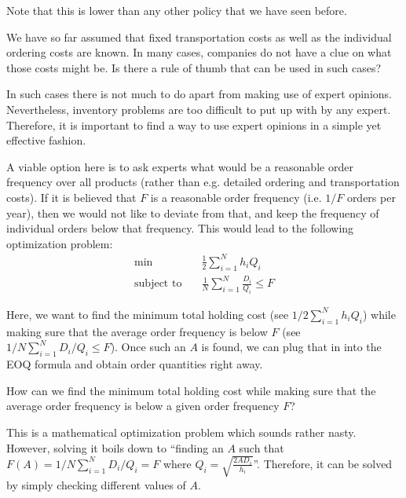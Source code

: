 Note that this is lower than any other policy that we have seen before. 


\begin{exercise}
We have so far assumed that fixed transportation costs as well as the individual ordering costs are known. In many cases, companies do not have a clue on what those costs might be. Is there a rule of thumb that can be used in such cases?


\begin{solution}
In such cases there is not much to do apart from making use of expert opinions. Nevertheless, inventory problems are too difficult to put up with by any expert. Therefore, it is important to find a way to use expert opinions in a simple yet effective fashion. 

A viable option here is to ask experts what would be a reasonable order frequency over all products (rather than e.g. detailed ordering and transportation costs). If it is believed that $F$ is a reasonable order frequency (i.e. $1/F$ orders per year), then we would not like to deviate from that, and keep the frequency of individual orders below that frequency. This would lead to the following optimization problem:
\begin{align*}
\min \quad
	& \frac{1}{2} \sum_{i=1}^N h_i Q_i \\
\text{subject to} \quad
	& \frac{1}{N} \sum_{i=1}^N \frac{D_i}{Q_i} \leq F
\end{align*}

Here, we want to find the minimum total holding cost (see $1/2 \sum_{i=1}^N h_i Q_i$) while making sure that the average order frequency is below $F$ (see $1/N \sum_{i=1}^N D_i/Q_i \leq F$). Once such an $A$ is found, we can plug that in into the EOQ formula and obtain order quantities right away.
\end{solution}
\end{exercise}

\begin{exercise}
How can we find the minimum total holding cost while making sure that the average order frequency is below a given order frequency $F$? 


\begin{solution}
This is a mathematical optimization problem which sounds rather nasty. However, solving it boils down to ``finding an $A$ such that $F(A)=1/N \sum_{i=1}^N D_i/Q_i=F$ where $Q_i=\sqrt{\frac{2AD_i}{h_i}}$''. Therefore, it can be solved by simply checking different values of $A$. 
\end{solution}
\end{exercise}

